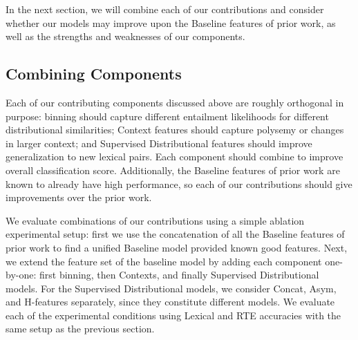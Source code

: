In the next section, we will combine each of our contributions and consider
whether our models may improve upon the Baseline features of prior work,
as well as the strengths and weaknesses of our components.

\subsection{Combining Components}

Each of our contributing components discussed above are roughly orthogonal
in purpose: binning should capture different entailment likelihoods for
different distributional similarities; Context features should capture
polysemy or changes in larger context; and Supervised Distributional features
should improve generalization to new lexical pairs. Each component should
combine to improve overall classification score. Additionally, the Baseline
features of prior work are known to already have high performance, so each
of our contributions should give improvements over the prior work.

We evaluate combinations of our contributions using a simple ablation
experimental setup: first we use the concatenation of all the Baseline features
of prior work to find a unified Baseline model provided known good features.
Next, we extend the feature set of the baseline model by adding each component
one-by-one: first binning, then Contexts, and finally Supervised Distributional
models. For the Supervised Distributional models, we consider Concat, Asym,
and H-features separately, since they constitute different models. We evaluate
each of the experimental conditions using Lexical and RTE accuracies with the
same setup as the previous section.

